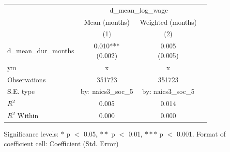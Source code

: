 \renewcommand\cellalign{t}
\begin{threeparttable}
\begin{tabular}{lccc}
\toprule
 & \multicolumn{2}{c}{d_mean_log_wage} \\
\cmidrule(lr){2-3} 
 & Mean (months) & Weighted (months) \\
 & (1) & (2) \\
\midrule
\addlinespace
d_mean_dur_months & \makecell{0.010*** \\ (0.002)} & \makecell{0.005 \\ (0.005)} \\
\midrule
\addlinespace
ym & x & x \\
\midrule
\addlinespace
Observations & 351723 & 351723 \\
S.E. type & by: naics3_soc_5 & by: naics3_soc_5 \\
$R^2$ & 0.005 & 0.014 \\
$R^2$ Within & 0.000 & 0.000 \\
\bottomrule
\end{tabular}
\footnotesize Significance levels: $*$ p $<$ 0.05, $**$ p $<$ 0.01, $***$ p $<$ 0.001. Format of coefficient cell: Coefficient 
 (Std. Error)
\end{threeparttable}